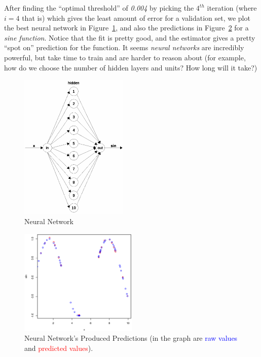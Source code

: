 \documentclass[a4paper, twocolumn]{article}
\begin{document}
    After finding the ``optimal threshold'' of \emph{0.004} by picking the $4^{th}$ iteration (where $i = 4$ that is) which gives the least amount of error for a validation set, we plot the best neural network in Figure~\ref{fig:network}, and also the predictions in Figure~\ref{fig:predictions} for a \emph{sine function}. Notice that the fit is pretty good, and the estimator gives a pretty ``spot on'' prediction for the function. It seems \emph{neural networks} are incredibly powerful, but take time to train and are harder to reason about (for example, how do we choose the number of hidden layers and units? How long will it take?)

    \nocite{*}
    
    
    \newpage

    \begin{figure}[h!]
        \centering
        \caption{Neural Network}
        \label{fig:network}
        \includegraphics[width=0.46\textwidth]{share/network.eps}
    \end{figure}

    \begin{figure}[h!]
        \centering
        \caption{Neural Network's Produced Predictions (in the graph are \textcolor{blue}{raw values} and \textcolor{red}{predicted values}).}
        \label{fig:predictions}
        \includegraphics[width=0.5\textwidth]{share/predictions.eps}
    \end{figure}
\end{document}
